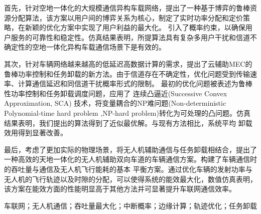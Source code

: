 首先，针对空地一体化的大规模通信异构车载网络，提出了一种基于博弈的鲁棒资源分配算法，该方案以用户间的博弈关系为核心，制定了实时功率分配和定价策略，在新颖的优化方案中实现了用户利益的最大化。
引入了概率约束，以确保用户服务的可靠性和稳定性。仿真结果表明，所提算法具有复杂多用户干扰和信道不确定性的空地一体化异构车载通信场景下是有效的。

其次，针对车辆网络越来越高的低延迟高数据计算的需求，提出了云辅助MEC的鲁棒功率控制和任务卸载的新方法。由于信道存在不确定性，优化问题受到传输速率、计算通信延迟和同信道干扰概率形式的限制。
最初的优化问题被表述为鲁棒性功率控制和任务卸载调度问题，应用了 连续凸逼近(Successive Convex Approximation, SCA) 技术，将变量耦合的NP难问题(Non-deterministic Polynomial-time hard problem ,NP-hard problem)转化为可处理的凸问题。仿真结果表明，我们提出的算法得到了近似最优解。与现有方法相比，系统平均
卸载效用得到显著改善。

最后，考虑了更加实际的物理场景，将无人机辅助通信与任务卸载相结合，提出了一种高效的天地一体化的无人机辅助双向车道的车辆通信方案。构建了车辆通信时的吞吐量与通信及无人机飞行能耗的基本
平衡方案。通过优化车辆的发射功率与无人机的飞行轨迹以及时隙的分配，可以使得系统的能效最大化，数值仿真表明，该方案在能效方面的性能明显高于其他方法并可显著提升车联网通信效率。


\begin{keywords}
车联网；无人机通信；吞吐量最大化；中断概率；边缘计算；轨迹优化；任务卸载
\end{keywords}

\makeatletter
{}  \CAST@value@classification   %
\makeatother

\newpage\ \vspace{-2.5em}
\vspace{0.23cm}   %
\begin{center}
\makeatletter
{}\textbf{\CAST@value@entitle}    %
\makeatother
\end{center}

